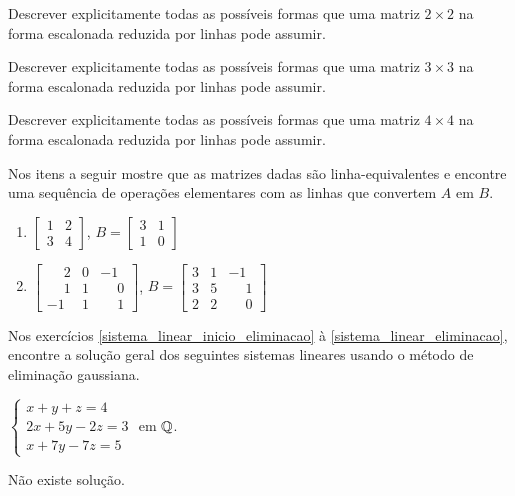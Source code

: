\documentclass[12pt]{exam}
\begin{document}
\begin{exercicio}
  Descrever explicitamente todas as possíveis formas que uma matriz $2 \times 2$ na forma escalonada reduzida por linhas pode assumir.
\end{exercicio}

\begin{exercicio}
  Descrever explicitamente todas as possíveis formas que uma matriz $3 \times 3$ na forma escalonada reduzida por linhas pode assumir.
\end{exercicio}

\begin{exercicio}
  Descrever explicitamente todas as possíveis formas que uma matriz $4 \times 4$ na forma escalonada reduzida por linhas pode assumir.
\end{exercicio}

\begin{exercicio}
  Nos itens a seguir mostre que as matrizes dadas são linha-equivalentes e encontre uma sequência de operações elementares com as
  linhas que convertem $A$ em $B$.
  \begin{enumerate}[label={\alph*})]
    \item $\begin{bmatrix}1 & 2\\3 & 4\end{bmatrix}$, $B = \begin{bmatrix}3 & 1\\1 & 0\end{bmatrix}$
    \item $\begin{bmatrix}\phantom{-} 2 & 0 & -1\\\phantom{-} 1 & 1 & \phantom{-} 0\\-1 & 1 & \phantom{-} 1\end{bmatrix}$,
      $B = \begin{bmatrix}3 & 1 & -1\\3 & 5 & \phantom{-} 1\\2 & 2 & \phantom{-} 0\end{bmatrix}$
  \end{enumerate}
\end{exercicio}

Nos exercícios \ref{sistema_linear_inicio_eliminacao} à \ref{sistema_linear_eliminacao}, encontre a solução geral dos seguintes sistemas lineares usando o método de eliminação gaussiana.
\begin{exercicio}\label{sistema_linear_inicio_eliminacao}
  $
    \begin{cases}
      x + y + z = 4\\
      2x + 5y - 2z = 3\\
      x + 7y - 7z = 5
    \end{cases}
  $
  em $\mathbb{Q}$.
  \begin{solucao}
    Não existe solução.
  \end{solucao}
\end{exercicio}
\end{document}
